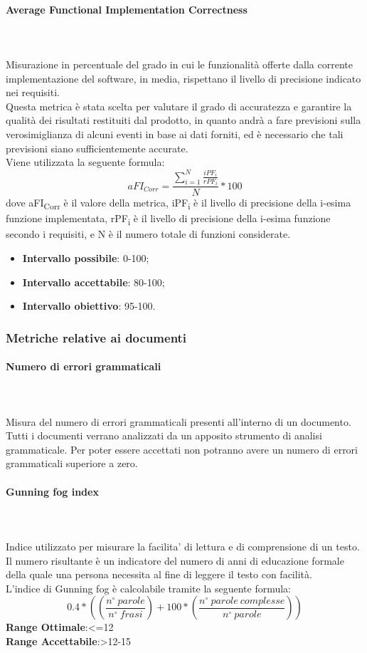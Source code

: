 \paragraph{Average Functional Implementation Correctness} ~\\ ~\\
Misurazione in percentuale del grado in cui le funzionalità offerte dalla corrente implementazione del software, in media, rispettano il livello di precisione indicato nei requisiti.\\
Questa metrica è stata scelta per valutare il grado di accuratezza e garantire la qualità dei risultati restituiti dal prodotto, in quanto andrà a fare previsioni sulla verosimiglianza di alcuni eventi in base ai dati forniti, ed è necessario che tali previsioni siano sufficientemente accurate.\\
Viene utilizzata la seguente formula:
$$aFI_{Corr}=\frac{\sum\limits_{i=1}^N\frac{iPF_i}{rPF_i}}{N}*100$$
dove aFI\textsubscript{Corr} è il valore della metrica, iPF\textsubscript{i} è il livello di precisione della i-esima funzione implementata, rPF\textsubscript{i} è il livello di precisione della i-esima funzione secondo i requisiti, e N è il numero totale di funzioni considerate.
\begin{itemize}
	\item{\textbf{Intervallo possibile}: 0-100;}
	\item{\textbf{Intervallo accettabile}: 80-100;}
	\item{\textbf{Intervallo obiettivo}: 95-100.}
\end{itemize}
\subsubsection{Metriche relative ai documenti}
\paragraph{Numero di errori grammaticali}~\\ ~\\
Misura del numero di errori grammaticali presenti all'interno di un documento.
Tutti i documenti verrano analizzati da un apposito strumento di analisi grammaticale. Per poter essere accettati non potranno avere un numero di errori grammaticali superiore a zero.

\paragraph{Gunning fog index}~\\ ~\\
Indice utilizzato per misurare la facilita' di lettura e di comprensione di un testo. Il numero risultante è un indicatore del numero di anni di educazione formale della quale una persona necessita al fine di leggere il testo con facilità. \\
L'indice di Gunning fog è calcolabile tramite la seguente formula:
$$
	0.4*((\frac{n^{\circ}\:parole}{n^{\circ}\:frasi})+100*(\frac{n^{\circ}\:parole\:complesse}{n^{\circ}\:parole}))
$$
\textbf{Range Ottimale}:<=12 \\
\textbf{Range Accettabile}:>12-15
